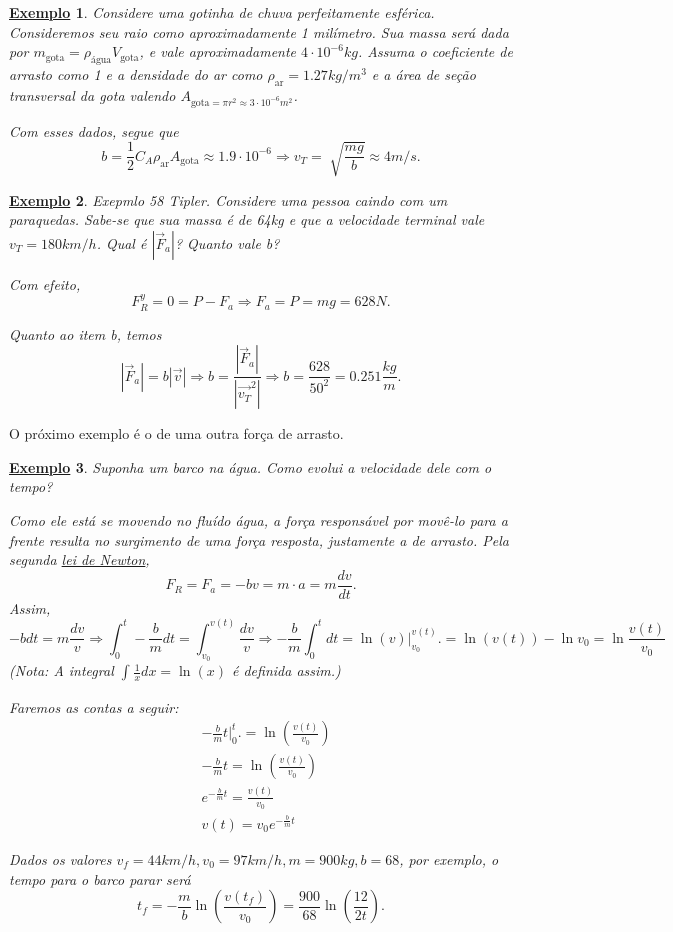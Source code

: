 \documentclass{article}
\newtheorem{example}{\underline{Exemplo}}
\begin{document}
   \begin{example}
     Considere uma gotinha de chuva perfeitamente esférica. Consideremos seu raio como aproximadamente 1 milímetro.
     Sua massa será dada por \(m_{\text{gota}}=\rho_{\text{água}}V_{\text{gota}}\), e vale aproximadamente \(4 \cdot 10^{-6}kg\). Assuma o coeficiente de arrasto como
     1 e a densidade do ar como \(\rho_{\text{ar}}=1.27kg/m^3\) e a área de se\c cão transversal da gota valendo \(A_{\text{gota}=\pi r^2\approx3 \cdot 10^{-6}m^2}\).

     Com esses dados, segue que 
       \[
         b = \frac{1}{2}C_{A}\rho_{\text{ar}}A_{\text{gota}}\approx 1.9 \cdot 10^{-6} \Rightarrow v_{T} = \sqrt[]{\frac{mg}{b}}\approx 4m/s.
       \]
   \end{example}
  \begin{example}
    Exepmlo 58 Tipler. Considere uma pessoa caindo com um paraquedas. Sabe-se que sua massa é de 64kg e que a velocidade terminal vale \(v_{T}=180km/h\). Qual é
    \(|\vec{F}_{a}|\)? Quanto vale b?

    Com efeito, 
      \[
        F_{R}^{y} = 0 = P-F_{a} \Rightarrow F_{a} = P = mg = 628N.
      \]

    Quanto ao item  b, temos 
      \[
        |\vec{F}_{a}| = b |\vec{v}| \Rightarrow  b = \frac{|\vec{F}_{a}|}{|\vec{v_{T}}^2|} \Rightarrow b = \frac{628}{50^2} = 0.251 \frac{kg}{m}.
      \]
  \end{example}
  O próximo exemplo é o de uma outra for\c ca de arrasto.
 \begin{example}
  Suponha um barco na água. Como evolui a velocidade dele com o tempo?

  Como ele está se movendo no fluído água, a for\c ca responsável por movê-lo para
  a frente resulta no surgimento de uma for\c ca resposta, justamente a de arrasto.
  Pela segunda \hyperlink{second_newton}{lei de Newton}, 
    \[
      F_{R} = F_{a} = -bv = m \cdot a = m \frac{dv}{dt}.
    \] 
  Assim, 
    \[
      -b dt = m \frac{dv}{v} \Rightarrow \int_{0}^{t}-\frac{b}{m}dt = \int_{v_{0}}^{v(t)}\frac{dv}{v}
      \Rightarrow -\frac{b}{m}\int_{0}^{t}dt = \ln{(v)}\biggl|_{v_{0}}^{v(t)}\biggr. = \ln{(v(t))} - \ln{v_{0}} = \ln{\frac{v(t)}{v_{0}}}
    \]
    (Nota: A integral \(\int_{}^{}\frac{1}{x}dx = \ln{(x)}\) é definida assim.)

  Faremos as contas a seguir: 
 \begin{align*}
   &-\frac{b}{m}t \biggl|_{0}^{t}\biggr. = \ln{(\frac{v(t)}{v_{0}})}\\
   &-\frac{b}{m}t = \ln{(\frac{v(t)}{v_{0}})}\\
   &e^{-\frac{b}{m}t} = \frac{v(t)}{v_{0}}\\
   &v(t) = v_{0}e^{-\frac{b}{m}t}
 \end{align*}
  
 Dados os valores \(v_{f}=44km/h, v_{0} = 97km/h, m=900kg, b=68\), por exemplo,
 o tempo para o barco parar será 
   \[
     t_{f} = -\frac{m}{b}\ln{(\frac{v(t_{f})}{v_{0}})} = \frac{900}{68}\ln{(\frac{12}{2t})}.
   \]
 \end{example}
\end{document}
